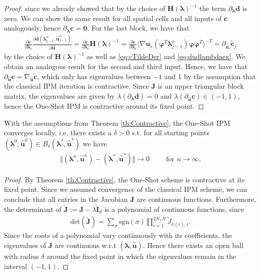 \begin{proof}
since we already showed that by the choice of $\bm{H}(\bm\lambda)^{-1}$ the term $\partial_{\bm{\lambda}} \bm{d}$ is zero. We can show the same result for all spatial cells and all inputs of $\bm{c}$ analogously, hence $\partial_{\bm{\lambda}} \bm{c} = \bm{0}$. For the last block, we have that 
\begin{align*}
\frac{\partial \bm{c}}{\partial \bm{\lambda}_{\ell}}\frac{\partial \bm{d}(\bm{\lambda}_{j-1}^{n},\bm{\hat u}_{j-1}^{n})}{\partial \bm{\hat u}} = \frac{\partial \bm{c}}{\partial \bm{\lambda}_{\ell}} \bm{H}(\bm\lambda)^{-1} = \frac{\partial \bm{c}}{\partial \bm{\lambda}_{\ell}} \langle \nabla\bm{u}_s(\bm{\varphi}^T\bm{\lambda}_{j-1}^n)\bm{\varphi}\bm{\varphi}^T \rangle^{-T} = \partial_{\bm{\hat u}_{\ell}}\bm{\tilde c}_j
\end{align*}
by the choice of $\bm{H}(\bm\lambda)^{-1}$ as well as \eqref{eq:cTildeDer} and \eqref{eq:dudlambdaex}. We obtain an analogous result for the second and third input. Hence, we have that $\partial_{\bm{\hat u}} \bm{c} = \nabla_{\bm{\hat u}}\bm{\tilde c}$, which only has eigenvalues between $-1$ and $1$ by the assumption that the classical IPM iteration is contractive. Since $\bm{J}$ is an upper triangular block matrix, the eigenvalues are given by $\lambda\left(\partial_{\bm{\lambda}} \bm{d}\right) = 0$ and $\lambda\left(\partial_{\bm{\hat u}} \bm{c}\right)\in(-1,1)$, hence the One-Shot IPM is contractive around its fixed point.
\end{proof}
\begin{theorem}\label{th:localConvergence}
With the assumptions from Theorem \ref{th:Contractive}, the One-Shot IPM converges locally, i.e. there exists a $\delta>0$ s.t. for all starting points $(\bm{\lambda}^0,\bm{\hat u}^0)\in B_{\delta}(\bm{\lambda}^*,\bm{\hat u}^*)$ we have
\begin{align*}
\Vert (\bm{\lambda}^n,\bm{\hat u}^n) - (\bm{\lambda}^*,\bm{\hat u}^*)\Vert \rightarrow 0 \qquad \text{ for } n \rightarrow \infty.
\end{align*}
\end{theorem}
\begin{proof}
By Theorem \ref{th:Contractive}, the One-Shot scheme is contractive at its fixed point. Since we assumed convergence of the classical IPM scheme, we can conclude that all entries in the Jacobian $\bm{J}$ are continuous functions. Furthermore, the determinant of $\bm{\tilde{J}}:=\bm{J}-\lambda \bm{I}_d$ is a polynomial of continuous functions, since
\begin{align*}
\text{det}(\bm{\tilde J}) = \sum_{\sigma} \text{sgn}(\sigma)\prod_{i = 1}^{2 N_x N} \tilde J_{\sigma(i),i}.
\end{align*}
Since the roots of a polynomial vary continuously with its coefficients, the eigenvalues of $\bm{J}$ are continuous w.r.t $(\bm{\lambda},\bm{\hat u})$. Hence there exists an open ball with radius $\delta$ around the fixed point in which the eigenvalues remain in the interval $(-1,1)$.
\end{proof}

